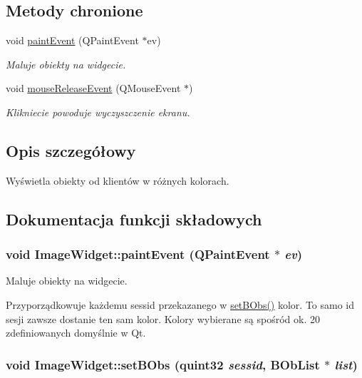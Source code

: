 \subsection*{Metody chronione}
\begin{CompactItemize}
\item 
void \hyperlink{class_image_widget_ea7cb36d8900749ab60d1e097fa1adfb}{paintEvent} (QPaintEvent $\ast$ev)
\begin{CompactList}\small\item\em Maluje obiekty na widgecie. \item\end{CompactList}\item 
\hypertarget{class_image_widget_531744038d8e49b411d849ef7207b9c3}{
void \hyperlink{class_image_widget_531744038d8e49b411d849ef7207b9c3}{mouseReleaseEvent} (QMouseEvent $\ast$)}
\label{class_image_widget_531744038d8e49b411d849ef7207b9c3}

\begin{CompactList}\small\item\em Klikniecie powoduje wyczyszczenie ekranu. \item\end{CompactList}\end{CompactItemize}


\subsection{Opis szczegółowy}
Wyświetla obiekty od klientów w różnych kolorach. 

\subsection{Dokumentacja funkcji składowych}
\hypertarget{class_image_widget_ea7cb36d8900749ab60d1e097fa1adfb}{
\subsubsection[{paintEvent}]{\setlength{\rightskip}{0pt plus 5cm}void ImageWidget::paintEvent (QPaintEvent $\ast$ {\em ev})}}
\label{class_image_widget_ea7cb36d8900749ab60d1e097fa1adfb}


Maluje obiekty na widgecie. 

Przyporządkowuje każdemu sessid przekazanego w \hyperlink{class_image_widget_a86269777fd7075bc223a5c8e011252b}{setBObs()} kolor. To samo id sesji zawsze dostanie ten sam kolor. Kolory wybierane są spośród ok. 20 zdefiniowanych domyślnie w Qt. \hypertarget{class_image_widget_a86269777fd7075bc223a5c8e011252b}{
\subsubsection[{setBObs}]{\setlength{\rightskip}{0pt plus 5cm}void ImageWidget::setBObs (quint32 {\em sessid}, \/  BObList $\ast$ {\em list})}}
\label{class_image_widget_a86269777fd7075bc223a5c8e011252b}


